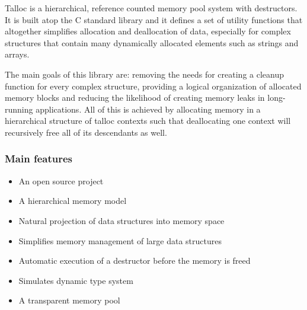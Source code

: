Talloc is a hierarchical, reference counted memory pool system with destructors.
It is built atop the C standard library and it defines a set of utility
functions that altogether simplifies allocation and deallocation of data,
especially for complex structures that contain many dynamically allocated
elements such as strings and arrays.

The main goals of this library are: removing the needs for creating a cleanup
function for every complex structure, providing a logical organization of
allocated memory blocks and reducing the likelihood of creating memory leaks in
long-running applications. All of this is achieved by allocating memory in a
hierarchical structure of talloc contexts such that deallocating one context
will recursively free all of its descendants as well.

\subsubsection{Main features}
\begin{itemize}
  \item An open source project
  \item A hierarchical memory model
  \item Natural projection of data structures into memory space
  \item Simplifies memory management of large data structures
  \item Automatic execution of a destructor before the memory is freed
  \item Simulates dynamic type system
  \item A transparent memory pool
\end{itemize}
